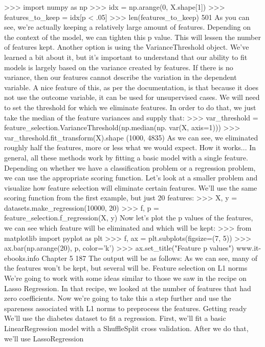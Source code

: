 >>> import numpy as np
>>> idx = np.arange(0, X.shape[1])
>>> features_to_keep = idx[p < .05]
>>> len(features_to_keep)
501
As you can see, we're actually keeping a relatively large amount of features. Depending on the
context of the model, we can tighten this p value. This will lessen the number of features kept.
Another option is using the VarianceThreshold object. We've learned a bit about it,
but it's important to understand that our ability to fit models is largely based on the variance
created by features. If there is no variance, then our features cannot describe the variation
in the dependent variable. A nice feature of this, as per the documentation, is that because
it does not use the outcome variable, it can be used for unsupervised cases.
We will need to set the threshold for which we eliminate features. In order to do that, we just
take the median of the feature variances and supply that:
>>> var_threshold = feature_selection.VarianceThreshold(np.median(np.
var(X, axis=1)))
>>> var_threshold.fit_transform(X).shape
(1000, 4835)
As we can see, we eliminated roughly half the features, more or less what we would expect.
How it works...
In general, all these methods work by fitting a basic model with a single feature. Depending on
whether we have a classification problem or a regression problem, we can use the appropriate
scoring function.
Let's look at a smaller problem and visualize how feature selection will eliminate certain
features. We'll use the same scoring function from the first example, but just 20 features:
>>> X, y = datasets.make_regression(10000, 20)
>>> f, p = feature_selection.f_regression(X, y)
Now let's plot the p values of the features, we can see which feature will be eliminated and
which will be kept:
>>> from matplotlib import pyplot as plt
>>> f, ax = plt.subplots(figsize=(7, 5))
>>> ax.bar(np.arange(20), p, color='k')
>>> ax.set_title("Feature p values")
www.it-ebooks.info
Chapter 5
187
The output will be as follows:
As we can see, many of the features won't be kept, but several will be.
Feature selection on L1 norms
We're going to work with some ideas similar to those we saw in the recipe on Lasso Regression.
In that recipe, we looked at the number of features that had zero coefficients.
Now we're going to take this a step further and use the spareness associated with L1 norms
to preprocess the features.
Getting ready
We'll use the diabetes dataset to fit a regression. First, we'll fit a basic LinearRegression
model with a ShuffleSplit cross validation. After we do that, we'll use LassoRegression
